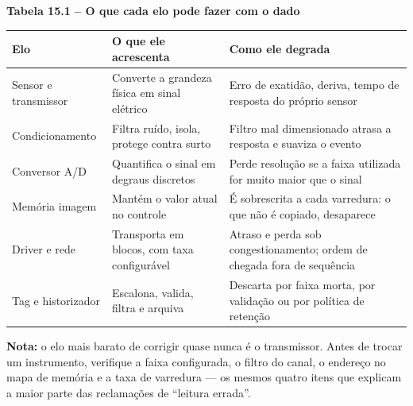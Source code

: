 \textbf{Tabela 15.1 -- O que cada elo pode fazer com o dado}

\begin{longtable}[]{@{}
  >{\raggedright\arraybackslash}p{}
  >{\raggedright\arraybackslash}p{}
  >{\raggedright\arraybackslash}p{}@{}}
\toprule\noalign{}
\begin{minipage}[b]{\linewidth}\raggedright
Elo
\end{minipage} & \begin{minipage}[b]{\linewidth}\raggedright
O que ele acrescenta
\end{minipage} & \begin{minipage}[b]{\linewidth}\raggedright
Como ele degrada
\end{minipage} \\
\midrule\noalign{}
\endhead
\bottomrule\noalign{}
\endlastfoot
Sensor e transmissor & Converte a grandeza física em sinal elétrico & Erro de exatidão, deriva, tempo de resposta do próprio sensor \\
Condicionamento & Filtra ruído, isola, protege contra surto & Filtro mal dimensionado atrasa a resposta e suaviza o evento \\
Conversor A/D & Quantifica o sinal em degraus discretos & Perde resolução se a faixa utilizada for muito maior que o sinal \\
Memória imagem & Mantém o valor atual no controle & É sobrescrita a cada varredura: o que não é copiado, desaparece \\
Driver e rede & Transporta em blocos, com taxa configurável & Atraso e perda sob congestionamento; ordem de chegada fora de sequência \\
Tag e historizador & Escalona, valida, filtra e arquiva & Descarta por faixa morta, por validação ou por política de retenção \\
\end{longtable}

\begin{caixanota}

\textbf{Nota:} o elo mais barato de corrigir quase nunca é o transmissor. Antes de trocar um
instrumento, verifique a faixa configurada, o filtro do canal, o endereço no mapa de memória e a
taxa de varredura --- os mesmos quatro itens que explicam a maior parte das reclamações de ``leitura
errada''.

\end{caixanota}

